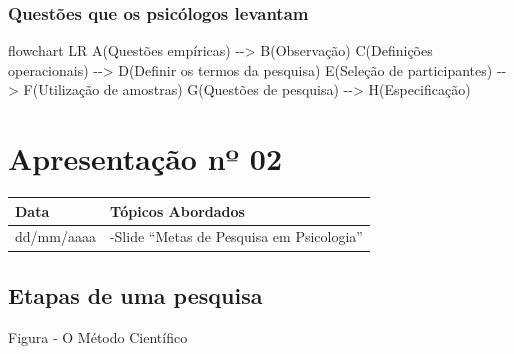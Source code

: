 \documentclass[
]{book}
\newenvironment{Shaded}{\begin{snugshade}}{\end{snugshade}}
\newcommand{\NormalTok}[1]{#1}
\begin{document}
\hypertarget{questuxf5es-que-os-psicuxf3logos-levantam-1}{%
\subsubsection{Questões que os psicólogos levantam}\label{questuxf5es-que-os-psicuxf3logos-levantam-1}}

\begin{Shaded}
\begin{Highlighting}[]
\NormalTok{flowchart LR}
\NormalTok{A(Questões empíricas) {-}{-}\textgreater{} B(Observação)}
\NormalTok{C(Definições operacionais) {-}{-}\textgreater{} D(Definir os termos da pesquisa)}
\NormalTok{E(Seleção de participantes) {-}{-}\textgreater{} F(Utilização de amostras)}
\NormalTok{G(Questões de pesquisa) {-}{-}\textgreater{} H(Especificação)}
\end{Highlighting}
\end{Shaded}

\hypertarget{apresentauxe7uxe3o-nuxba-02-1}{%
\section{Apresentação nº 02}\label{apresentauxe7uxe3o-nuxba-02-1}}

\begin{longtable}[]{@{}ll@{}}
\toprule()
Data & Tópicos Abordados \\
\midrule()
\endhead
dd/mm/aaaa & -Slide ``Metas de Pesquisa em Psicologia'' \\
\bottomrule()
\end{longtable}

\hypertarget{etapas-de-uma-pesquisa-1}{%
\subsection{Etapas de uma pesquisa}\label{etapas-de-uma-pesquisa-1}}

Figura - O Método Científico
\end{document}
